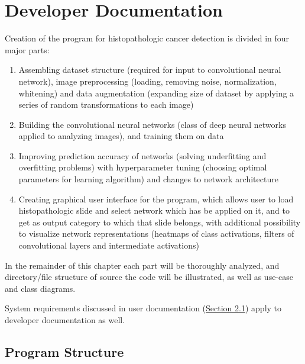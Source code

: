 \chapter{Developer Documentation}
\label{ch:impl}

Creation of the program for histopathologic cancer detection is divided in four major parts:
\begin{enumerate}
	\itemsep0em
	\item Assembling dataset structure (required for input to convolutional neural network), image preprocessing (loading, removing noise, normalization, whitening) and data augmentation (expanding size of dataset by applying a series of random transformations to each image)
	\item Building the convolutional neural networks (class of deep neural networks applied to analyzing images), and training them on data
	\item Improving prediction accuracy of networks (solving underfitting and overfitting problems) with hyperparameter tuning (choosing optimal parameters for learning algorithm) and changes to network architecture
	\item Creating graphical user interface for the program, which allows user to load histopathologic slide and select network which has be applied on it, and to get as output category to which that slide belongs, with additional possibility to visualize network representations (heatmaps of class activations, filters of convolutional layers and intermediate activations)
\end{enumerate}
In the remainder of this chapter each part will be thoroughly analyzed, and directory/file structure of source the code will be illustrated, as well as use-case and class diagrams. 

System requirements discussed in user documentation (\textcolor{red}{\hyperref[sysreq]{Section 2.1}}) apply to developer documentation as well. 
\clearpage

\section{Program Structure}

